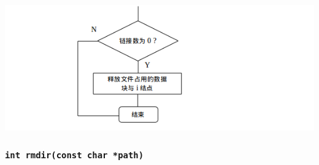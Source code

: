 \documentclass[nofonts]{ctexart}
\begin{document}
\begin{itemize}
  \includegraphics[width=15cm]{./images/./unlink_2.png}
  \end{itemize}
  \subsubsection{\texttt{int rmdir(const char *path)}}
\end{document}
